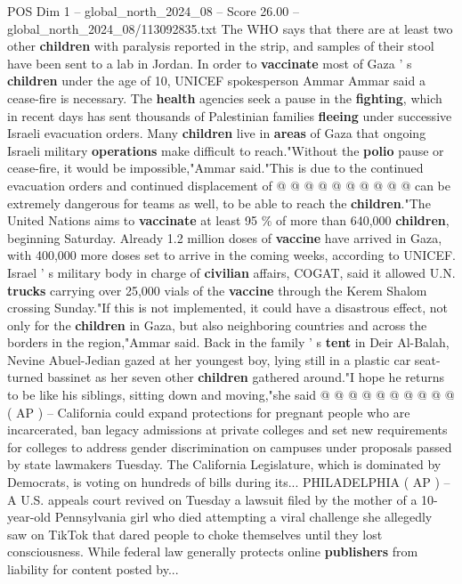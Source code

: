 \begin{textsample}{POS Dim 1 – global\_north\_2024\_08 – Score 26.00 – global\_north\_2024\_08/113092835.txt}
The WHO says that there are at least two other \textbf{children} with paralysis reported in the strip, and samples of their stool have been sent to a lab in Jordan.
In order to \textbf{vaccinate} most of Gaza ' s \textbf{children} under the age of 10, UNICEF spokesperson Ammar Ammar said a cease-fire is necessary.
The \textbf{health} agencies seek a pause in the \textbf{fighting}, which in recent days has sent thousands of Palestinian families \textbf{fleeing} under successive Israeli evacuation orders.
Many \textbf{children} live in \textbf{areas} of Gaza that ongoing Israeli military \textbf{operations} make difficult to reach."Without the \textbf{polio} pause or cease-fire, it would be impossible,"Ammar said."This is due to the continued evacuation orders and continued displacement of @ @ @ @ @ @ @ @ @ @ can be extremely dangerous for teams as well, to be able to reach the \textbf{children}."The United Nations aims to \textbf{vaccinate} at least 95 \% of more than 640,000 \textbf{children}, beginning Saturday.
Already 1.2 million doses of \textbf{vaccine} have arrived in Gaza, with 400,000 more doses set to arrive in the coming weeks, according to UNICEF.
Israel ' s military body in charge of \textbf{civilian} affairs, COGAT, said it allowed U.N. \textbf{trucks} carrying over 25,000 vials of the \textbf{vaccine} through the Kerem Shalom crossing Sunday."If this is not implemented, it could have a disastrous effect, not only for the \textbf{children} in Gaza, but also neighboring countries and across the borders in the region,"Ammar said.
Back in the family ' s \textbf{tent} in Deir Al-Balah, Nevine Abuel-Jedian gazed at her youngest boy, lying still in a plastic car seat-turned bassinet as her seven other \textbf{children} gathered around."I hope he returns to be like his siblings, sitting down and moving,"she said @ @ @ @ @ @ @ @ @ @ ( AP ) -- California could expand protections for pregnant people who are incarcerated, ban legacy admissions at private colleges and set new requirements for colleges to address gender discrimination on campuses under proposals passed by state lawmakers Tuesday.
The California Legislature, which is dominated by Democrats, is voting on hundreds of bills during its...
PHILADELPHIA ( AP ) -- A U.S. appeals court revived on Tuesday a lawsuit filed by the mother of a 10-year-old Pennsylvania girl who died attempting a viral challenge she allegedly saw on TikTok that dared people to choke themselves until they lost consciousness.
While federal law generally protects online \textbf{publishers} from liability for content posted by...

\end{textsample}
